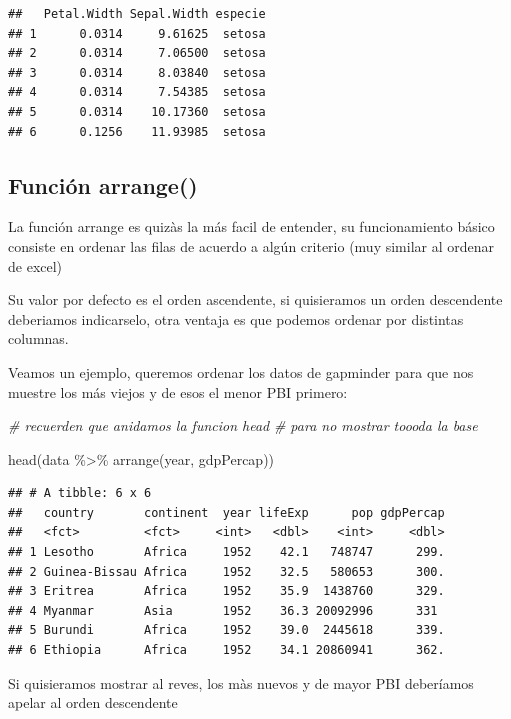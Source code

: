 \documentclass[
]{book}
\newenvironment{Shaded}{\begin{snugshade}}{\end{snugshade}}
\newcommand{\CommentTok}[1]{\textcolor[rgb]{0.56,0.35,0.01}{\textit{#1}}}
\newcommand{\FunctionTok}[1]{\textcolor[rgb]{0.00,0.00,0.00}{#1}}
\newcommand{\NormalTok}[1]{#1}
\newcommand{\SpecialCharTok}[1]{\textcolor[rgb]{0.00,0.00,0.00}{#1}}
\begin{document}
\begin{verbatim}
##   Petal.Width Sepal.Width especie
## 1      0.0314     9.61625  setosa
## 2      0.0314     7.06500  setosa
## 3      0.0314     8.03840  setosa
## 4      0.0314     7.54385  setosa
## 5      0.0314    10.17360  setosa
## 6      0.1256    11.93985  setosa
\end{verbatim}

\hypertarget{funciuxf3n-arrange}{%
\subsection{Función arrange()}\label{funciuxf3n-arrange}}

La función arrange es quizàs la más facil de entender, su funcionamiento básico consiste en ordenar las filas de acuerdo a algún criterio (muy similar al ordenar de excel)

Su valor por defecto es el orden ascendente, si quisieramos un orden descendente deberiamos indicarselo, otra ventaja es que podemos ordenar por distintas columnas.

Veamos un ejemplo, queremos ordenar los datos de gapminder para que nos muestre los más viejos y de esos el menor PBI primero:

\begin{Shaded}
\begin{Highlighting}[]
\CommentTok{\# recuerden que anidamos la funcion head }
\CommentTok{\# para no mostrar toooda la base }

\FunctionTok{head}\NormalTok{(data }\SpecialCharTok{\%\textgreater{}\%} \FunctionTok{arrange}\NormalTok{(year, gdpPercap))}
\end{Highlighting}
\end{Shaded}

\begin{verbatim}
## # A tibble: 6 x 6
##   country       continent  year lifeExp      pop gdpPercap
##   <fct>         <fct>     <int>   <dbl>    <int>     <dbl>
## 1 Lesotho       Africa     1952    42.1   748747      299.
## 2 Guinea-Bissau Africa     1952    32.5   580653      300.
## 3 Eritrea       Africa     1952    35.9  1438760      329.
## 4 Myanmar       Asia       1952    36.3 20092996      331 
## 5 Burundi       Africa     1952    39.0  2445618      339.
## 6 Ethiopia      Africa     1952    34.1 20860941      362.
\end{verbatim}

Si quisieramos mostrar al reves, los màs nuevos y de mayor PBI deberíamos apelar al orden descendente
\end{document}
